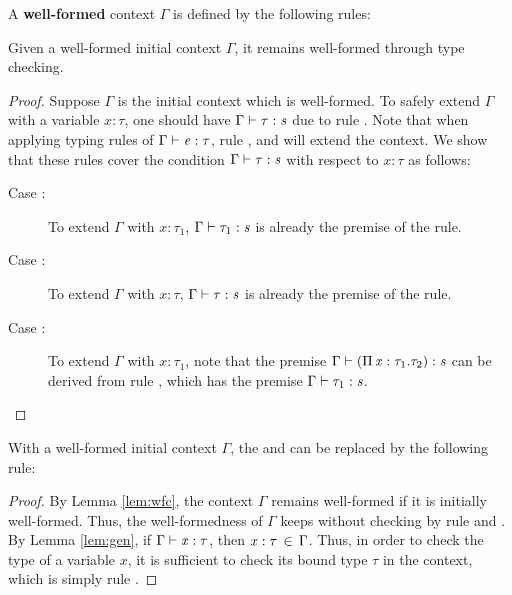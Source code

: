 \begin{dfn}
	A \textbf{well-formed} context $\Gamma$ is defined by the following rules:
	
	\textnormal{\ottdefnctx{}}
\end{dfn}

\begin{lem}\label{lem:wfc}
	Given a well-formed initial context $\Gamma$, it remains well-formed through type checking.
\end{lem}

\begin{proof}
	Suppose $\Gamma$ is the initial context which is well-formed. To safely extend $\Gamma$ with a variable $x:\tau$, one should have $\Gamma  \vdash  \tau  :  \mathit{s}$ due to rule . Note that when applying typing rules of $\Gamma  \vdash  \mathit{e}  :  \tau$, rule ,  and  will extend the context. We show that these rules cover the condition $\Gamma  \vdash  \tau  :  \mathit{s}$ with respect to $x:\tau$ as follows:
	\begin{description}
		\item[Case :] To extend $\Gamma$ with $x:\tau_{{\mathrm{1}}}$, $\Gamma  \vdash  \tau_{{\mathrm{1}}}  :  \mathit{s}$ is already the premise of the rule.
		\item[Case :] To extend $\Gamma$ with $x:\tau$, $\Gamma  \vdash  \tau  :  \mathit{s}$ is already the premise of the rule.
		\item[Case :] To extend $\Gamma$ with $x:\tau_{{\mathrm{1}}}$, note that the premise $\Gamma  \vdash  (  \Pi \, \mathit{x}  :  \tau_{{\mathrm{1}}}  .  \tau_{{\mathrm{2}}}  )  :  \mathit{s}$ can be derived from rule , which has the premise $\Gamma  \vdash  \tau_{{\mathrm{1}}}  :  \mathit{s}$.
	\end{description}
\end{proof}

\begin{lem}\label{lem:wfcopt}
	With a well-formed initial context $\Gamma$, the  and  can be replaced by the following rule: \ottusedrule{\ottdruleTXXVarEnv{}}
\end{lem}

\begin{proof}
	By Lemma \ref{lem:wfc}, the context $\Gamma$ remains well-formed if it is initially well-formed. Thus, the well-formedness of $\Gamma$ keeps without checking by rule  and . By Lemma \ref{lem:gen}, if $\Gamma  \vdash  \mathit{x}  :  \tau$, then $\mathit{x}  :  \tau \, \in \, \Gamma$. Thus, in order to check the type of a variable $x$, it is sufficient to check its bound type $\tau$ in the context, which is simply rule .
\end{proof}

